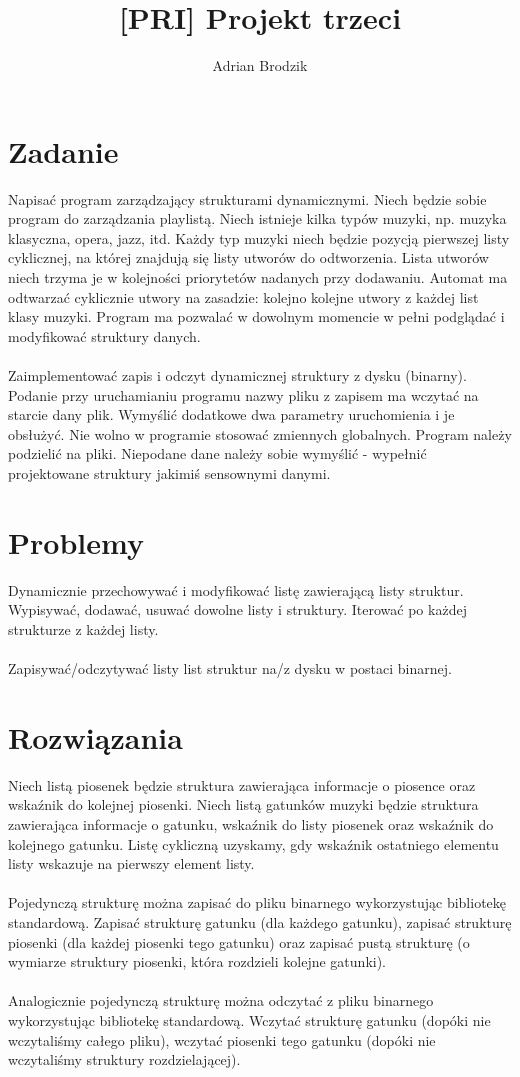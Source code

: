 \documentclass[a4paper, 12pt]{article}
\title{\bf [PRI] Projekt trzeci}
\author{Adrian Brodzik}
\begin{document}
\maketitle

\section*{Zadanie}
Napisać program zarządzający strukturami dynamicznymi. Niech będzie sobie program do zarządzania playlistą. Niech istnieje kilka typów muzyki, np. muzyka klasyczna, opera, jazz, itd. Każdy typ muzyki niech będzie pozycją pierwszej listy cyklicznej, na której znajdują się listy utworów do odtworzenia. Lista utworów niech trzyma je w kolejności priorytetów nadanych przy dodawaniu. Automat ma odtwarzać cyklicznie utwory na zasadzie: kolejno kolejne utwory z każdej list klasy muzyki. Program ma pozwalać w dowolnym momencie w pełni podglądać i modyfikować struktury danych.
\\\\
Zaimplementować zapis i odczyt dynamicznej struktury z dysku (binarny). Podanie przy uruchamianiu programu nazwy pliku z zapisem ma wczytać na starcie dany plik. Wymyślić dodatkowe dwa parametry uruchomienia i je obsłużyć. Nie wolno w programie stosować zmiennych globalnych. Program należy podzielić na pliki. Niepodane dane należy sobie wymyślić - wypełnić projektowane struktury jakimiś sensownymi danymi.

\section*{Problemy}
Dynamicznie przechowywać i modyfikować listę zawierającą listy struktur. Wypisywać, dodawać, usuwać dowolne listy i struktury. Iterować po każdej strukturze z każdej listy.
\\\\
Zapisywać/odczytywać listy list struktur na/z dysku w postaci binarnej.

\section*{Rozwiązania}
Niech listą piosenek będzie struktura zawierająca informacje o piosence oraz wskaźnik do kolejnej piosenki. Niech listą gatunków muzyki będzie struktura zawierająca informacje o gatunku, wskaźnik do listy piosenek oraz wskaźnik do kolejnego gatunku. Listę cykliczną uzyskamy, gdy wskaźnik ostatniego elementu listy wskazuje na pierwszy element listy.
\\\\
Pojedynczą strukturę można zapisać do pliku binarnego wykorzystując bibliotekę standardową. Zapisać strukturę gatunku (dla każdego gatunku), zapisać strukturę piosenki (dla każdej piosenki tego gatunku) oraz zapisać pustą strukturę (o wymiarze struktury piosenki, która rozdzieli kolejne gatunki).
\\\\
Analogicznie pojedynczą strukturę można odczytać z pliku binarnego wykorzystując bibliotekę standardową. Wczytać strukturę gatunku (dopóki nie wczytaliśmy całego pliku), wczytać piosenki tego gatunku (dopóki nie wczytaliśmy struktury rozdzielającej).
\end{document}
